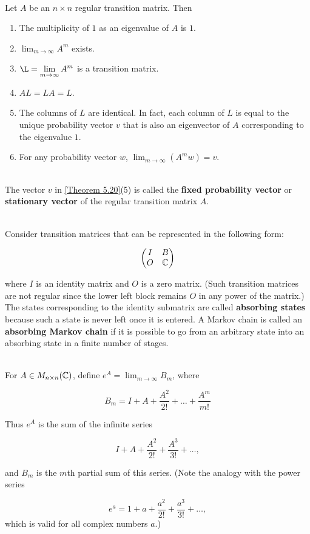 \begin{theorem}\label{Theorem 5.20}
	\hfill\\
	Let $A$ be an $n \times n$ regular transition matrix. Then

	\begin{enumerate}
		\item The multiplicity of $1$ as an eigenvalue of $A$ is $1$.
		\item $\displaystyle\lim_{m \to \infty}A^m$ exists.
		\item $\L = \displaystyle\lim_{m \to \infty}A^m$ is a transition matrix.
		\item $AL = LA = L$.
		\item The columns of $L$ are identical. In fact, each column of $L$ is equal to the unique probability vector $v$ that is also an eigenvector of $A$ corresponding to the eigenvalue $1$.
		\item For any probability vector $w$, $\displaystyle\lim_{m \to \infty}(A^mw) = v$.
	\end{enumerate}
\end{theorem}

\begin{definition}
	\hfill\\
	The vector $v$ in \autoref{Theorem 5.20}(5) is called the \textbf{fixed probability vector} or \textbf{stationary vector} of the regular transition matrix $A$.
\end{definition}

\begin{definition}
	\hfill\\
	Consider transition matrices that can be represented in the following form:

	\[\begin{pmatrix}
			I & B  \\
			O & \mathbb{C}
		\end{pmatrix}\]

	where $I$ is an identity matrix and $O$ is a zero matrix. (Such transition matrices are not regular since the lower left block remains $O$ in any power of the matrix.) The states corresponding to the identity submatrix are called \textbf{absorbing states} because such a state is never left once it is entered. A Markov chain is called an \textbf{absorbing Markov chain} if it is possible to go from an arbitrary state into an absorbing state in a finite number of stages.
\end{definition}

\begin{definition}
	\hfill\\
	For $A \in M_{n \times n}(\mathbb{C})$, define $e^A = \displaystyle\lim_{m \to \infty}B_m$, where

	\[B_m = I + A + \frac{A^2}{2!} + \dots + \frac{A^m}{m!}\]

	Thus $e^A$ is the sum of the infinite series

	\[I + A + \frac{A^2}{2!} + \frac{A^3}{3!} + \dots,\]

	and $B_m$ is the $m$th partial sum of this series. (Note the analogy with the power series

	\[e^a = 1 + a + \frac{a^2}{2!}+\frac{a^3}{3!}+\dots,\]
	which is valid for all complex numbers $a$.)
\end{definition}
